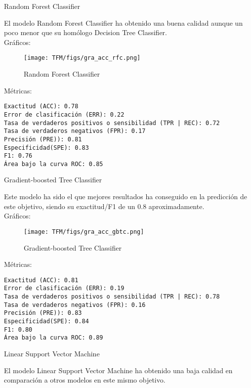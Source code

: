 \begin{itemize}
\begin{minipage}{\linewidth}
    \item Random Forest Classifier
    
El modelo Random Forest Classifier ha obtenido una buena calidad aunque un poco menor que su homólogo Decision Tree Classifier.
\\

Gráficos:
\begin{figure}[H]
\centerline{\texttt{[image: TFM/figs/gra\_acc\_rfc.png]}}
\caption{Random Forest Classifier}
\label{fig:gra_acc_rfc}
\end{figure}
Métricas:
\begin{verbatim}
Exactitud (ACC): 0.78
Error de clasificación (ERR): 0.22
Tasa de verdaderos positivos o sensibilidad (TPR | REC): 0.72
Tasa de verdaderos negativos (FPR): 0.17
Precisión (PRE)): 0.81
Especificidad(SPE): 0.83
F1: 0.76
Área bajo la curva ROC: 0.85
\end{verbatim}
\end{minipage}

\begin{minipage}{\linewidth}
    \item Gradient-boosted Tree Classifier
    
Este modelo ha sido el que mejores resultados ha conseguido en la predicción de este objetivo, siendo su exactitud/F1 de un 0.8 aproximadamente.
\\

Gráficos:
\begin{figure}[H]
\centerline{\texttt{[image: TFM/figs/gra\_acc\_gbtc.png]}}
\caption{Gradient-boosted Tree Classifier}
\label{fig:gra_acc_gbtc}
\end{figure}
Métricas:
\begin{verbatim}
Exactitud (ACC): 0.81
Error de clasificación (ERR): 0.19
Tasa de verdaderos positivos o sensibilidad (TPR | REC): 0.78
Tasa de verdaderos negativos (FPR): 0.16
Precisión (PRE)): 0.83
Especificidad(SPE): 0.84
F1: 0.80
Área bajo la curva ROC: 0.89
\end{verbatim}
\end{minipage}

\begin{minipage}{\linewidth}
    \item Linear Support Vector Machine
    
El modelo Linear Support Vector Machine ha obtenido una baja calidad en comparación a otros modelos en este mismo objetivo. 
\\


\end{minipage}
\end{itemize}
